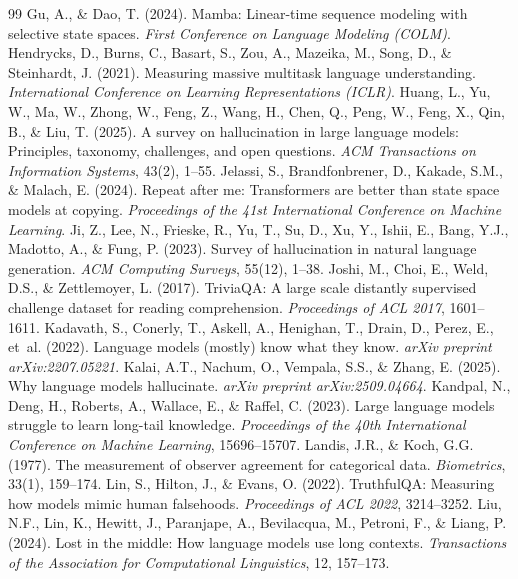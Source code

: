 \documentclass[11pt,a4paper,oneside]{report}
\begin{document}
\begin{thebibliography}{99}
 Gu, A., \& Dao, T. (2024). Mamba: Linear-time sequence modeling with selective state spaces. \emph{First Conference on Language Modeling (COLM)}.
 Hendrycks, D., Burns, C., Basart, S., Zou, A., Mazeika, M., Song, D., \& Steinhardt, J. (2021). Measuring massive multitask language understanding. \emph{International Conference on Learning Representations (ICLR)}.
 Huang, L., Yu, W., Ma, W., Zhong, W., Feng, Z., Wang, H., Chen, Q., Peng, W., Feng, X., Qin, B., \& Liu, T. (2025). A survey on hallucination in large language models: Principles, taxonomy, challenges, and open questions. \emph{ACM Transactions on Information Systems}, 43(2), 1--55.
 Jelassi, S., Brandfonbrener, D., Kakade, S.M., \& Malach, E. (2024). Repeat after me: Transformers are better than state space models at copying. \emph{Proceedings of the 41st International Conference on Machine Learning}.
 Ji, Z., Lee, N., Frieske, R., Yu, T., Su, D., Xu, Y., Ishii, E., Bang, Y.J., Madotto, A., \& Fung, P. (2023). Survey of hallucination in natural language generation. \emph{ACM Computing Surveys}, 55(12), 1--38.
 Joshi, M., Choi, E., Weld, D.S., \& Zettlemoyer, L. (2017). TriviaQA: A large scale distantly supervised challenge dataset for reading comprehension. \emph{Proceedings of ACL 2017}, 1601--1611.
 Kadavath, S., Conerly, T., Askell, A., Henighan, T., Drain, D., Perez, E., et~al. (2022). Language models (mostly) know what they know. \emph{arXiv preprint arXiv:2207.05221}.
 Kalai, A.T., Nachum, O., Vempala, S.S., \& Zhang, E. (2025). Why language models hallucinate. \emph{arXiv preprint arXiv:2509.04664}.
 Kandpal, N., Deng, H., Roberts, A., Wallace, E., \& Raffel, C. (2023). Large language models struggle to learn long-tail knowledge. \emph{Proceedings of the 40th International Conference on Machine Learning}, 15696--15707.
 Landis, J.R., \& Koch, G.G. (1977). The measurement of observer agreement for categorical data. \emph{Biometrics}, 33(1), 159--174.
 Lin, S., Hilton, J., \& Evans, O. (2022). TruthfulQA: Measuring how models mimic human falsehoods. \emph{Proceedings of ACL 2022}, 3214--3252.
 Liu, N.F., Lin, K., Hewitt, J., Paranjape, A., Bevilacqua, M., Petroni, F., \& Liang, P. (2024). Lost in the middle: How language models use long contexts. \emph{Transactions of the Association for Computational Linguistics}, 12, 157--173.

\end{thebibliography}
\end{document}
